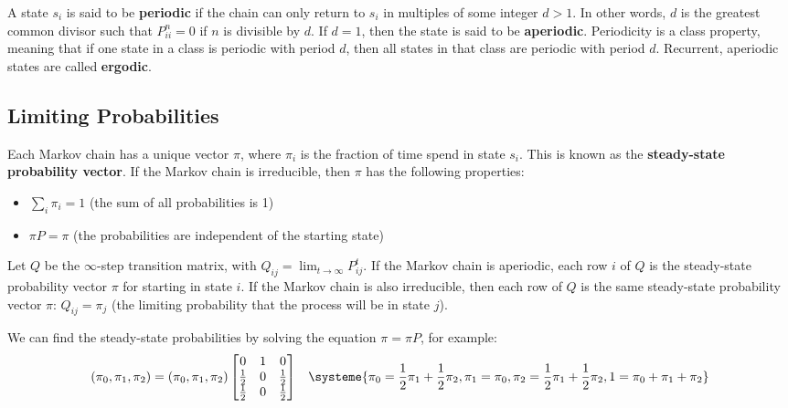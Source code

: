 \documentclass[12pt]{article}
\begin{document}
\noindent
A state $s_i$ is said to be \textbf{periodic} if the chain can only return to $s_i$ in multiples of some integer $d > 1$.
In other words, $d$ is the greatest common divisor such that $P_{ii}^n = 0$ if $n$ is divisible by $d$.
If $d = 1$, then the state is said to be \textbf{aperiodic}.
Periodicity is a class property, meaning that if one state in a class is periodic with period $d$, then all states in that class are periodic with period $d$.
Recurrent, aperiodic states are called \textbf{ergodic}.

\subsection{Limiting Probabilities}
Each Markov chain has a unique vector $\pi$, where $\pi_i$ is the fraction of time spend in state $s_i$.
This is known as the \textbf{steady-state probability vector}.
If the Markov chain is irreducible, then $\pi$ has the following properties:

\begin{itemize}
    \item $\displaystyle \sum_{i} \pi_i = 1$ \hfill (the sum of all probabilities is 1)
    \item $\pi P = \pi$ \hfill (the probabilities are independent of the starting state)
\end{itemize}

\noindent
Let $Q$ be the $\infty$-step transition matrix, with $\displaystyle Q_{ij} = \lim_{t \rightarrow \infty} P_{ij}^t$.
If the Markov chain is aperiodic, each row $i$ of $Q$ is the steady-state probability vector $\pi$ for starting in state $i$.
If the Markov chain is also irreducible, then each row of $Q$ is the same steady-state probability vector $\pi$: $Q_{ij} = \pi_j$ (the limiting probability that the process will be in state $j$).

\newpage
\noindent
We can find the steady-state probabilities by solving the equation $\pi = \pi P$, for example:
\begin{align*}
    (\pi_0, \pi_1, \pi_2) = (\pi_0, \pi_1, \pi_2)\begin{bmatrix}
        0 & 1 & 0 \\
        \frac{1}{2} & 0 & \frac{1}{2} \\
        \frac{1}{2} & 0 & \frac{1}{2}
    \end{bmatrix} && \systeme{
        \pi_0 = \frac{1}{2}\pi_1 + \frac{1}{2}\pi_2,
        \pi_1 = \pi_0,
        \pi_2 = \frac{1}{2}\pi_1 + \frac{1}{2}\pi_2,
        1 = \pi_0 + \pi_1 + \pi_2
    }
\end{align*}
\end{document}
